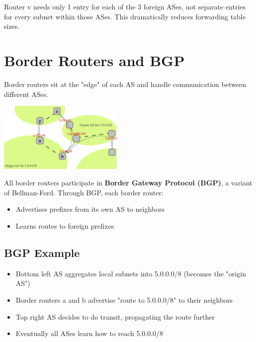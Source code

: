 \documentclass[../../compsys.tex]{subfiles}
\begin{document}
Router v needs only 1 entry for each of the 3 foreign ASes, not separate entries for every subnet within those ASes. This dramatically reduces forwarding table sizes.

\section{Border Routers and BGP}
Border routers sit at the "edge" of each AS and handle communication between different ASes.

\begin{center}
    \includegraphics[width=0.45\textwidth]{images/example-as-3.png}
\end{center}

All border routers participate in \textbf{Border Gateway Protocol (BGP)}, a variant of Bellman-Ford. Through BGP, each border router:
\begin{itemize}
    \item Advertises prefixes from its own AS to neighbors
    \item Learns routes to foreign prefixes
\end{itemize}

\subsection{BGP Example}
\begin{itemize}
    \item Bottom left AS aggregates local subnets into 5.0.0.0/8 (becomes the "origin AS")
    \item Border routers a and b advertise "route to 5.0.0.0/8" to their neighbors
    \item Top right AS decides to do transit, propagating the route further
    \item Eventually all ASes learn how to reach 5.0.0.0/8
\end{itemize}
\end{document}
